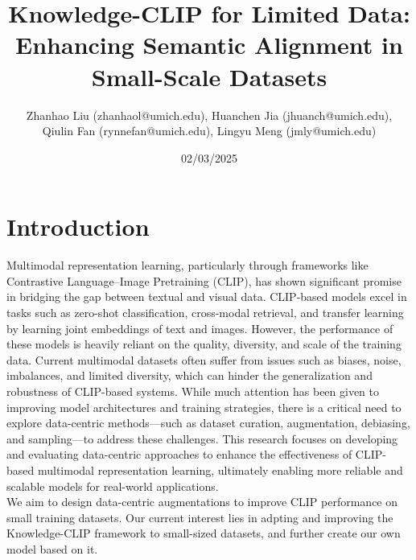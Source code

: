 \documentclass[11pt,letterpaper]{article}
\begin{document}
\title{Knowledge-CLIP for Limited Data: Enhancing Semantic Alignment in Small-Scale Datasets}


\author{
Zhanhao Liu (zhanhaol@umich.edu), 
Huanchen Jia (jhuanch@umich.edu),\\
Qiulin Fan (rynnefan@umich.edu),
Lingyu Meng (jmly@umich.edu)
}

\date{02/03/2025}


\maketitle


\section{Introduction}
Multimodal representation learning, particularly through frameworks like Contrastive Language–Image Pretraining (CLIP), has shown significant promise in bridging the gap between textual and visual data. CLIP-based models excel in tasks such as zero-shot classification, cross-modal retrieval, and transfer learning by learning joint embeddings of text and images. However, the performance of these models is heavily reliant on the quality, diversity, and scale of the training data. Current multimodal datasets often suffer from issues such as biases, noise, imbalances, and limited diversity, which can hinder the generalization and robustness of CLIP-based systems. While much attention has been given to improving model architectures and training strategies, there is a critical need to explore data-centric methods—such as dataset curation, augmentation, debiasing, and sampling—to address these challenges. This research focuses on developing and evaluating data-centric approaches to enhance the effectiveness of CLIP-based multimodal representation learning, ultimately enabling more reliable and scalable models for real-world applications.\\
We aim to design data-centric augmentations to improve CLIP performance on small training datasets. Our current interest lies in adpting and improving the Knowledge-CLIP framework\cite{pan2022contrastivelanguageimagepretrainingknowledge} to small-sized datasets, and further create our own model based on it.
\end{document}
